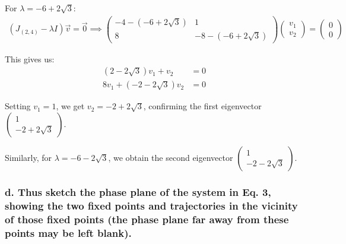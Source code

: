 \documentclass[12pt]{article}
\begin{document}
For $\lambda = -6 + 2\sqrt{3}$:
\begin{align*}
    (J_{(2,4)} - \lambda I)\vec{v} = \vec{0} \implies \begin{pmatrix}
                                                          -4-(-6+2\sqrt{3}) & 1                 \\
                                                          8                 & -8-(-6+2\sqrt{3})
                                                      \end{pmatrix}\begin{pmatrix}
                                                                       v_1 \\ v_2
                                                                   \end{pmatrix} = \begin{pmatrix}
                                                                                       0 \\ 0
                                                                                   \end{pmatrix}
\end{align*}

This gives us:
\begin{align*}
    (2-2\sqrt{3})v_1 + v_2   & = 0 \\
    8v_1 + (-2-2\sqrt{3})v_2 & = 0
\end{align*}

Setting $v_1 = 1$, we get $v_2 = -2 + 2\sqrt{3}$, confirming the first
eigenvector $\begin{pmatrix} 1 \\ -2+2\sqrt{3} \end{pmatrix}$.

Similarly, for $\lambda = -6 - 2\sqrt{3}$, we obtain the second eigenvector $\begin{pmatrix} 1 \\ -2-2\sqrt{3} \end{pmatrix}$.

\subsubsection*{d. Thus sketch the phase plane of the system in Eq. 3, showing the two fixed points and trajectories in the
    vicinity of those fixed points (the phase plane far away from these points may be left blank).}
\end{document}
